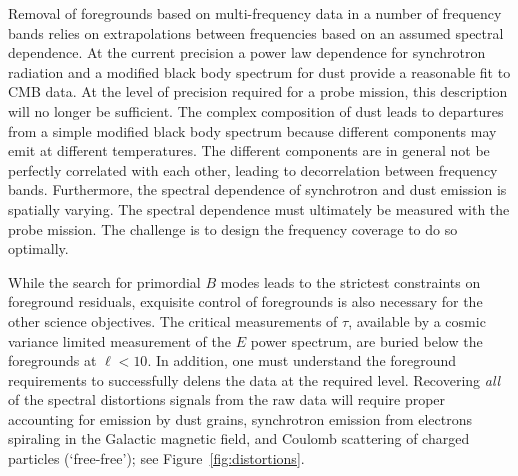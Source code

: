 
Removal of foregrounds based on multi-frequency data in a number of frequency bands relies on extrapolations between frequencies based on an assumed spectral dependence. At the current precision a power law dependence for synchrotron radiation and a modified black body spectrum for dust provide a reasonable fit to CMB data. At the level of precision required for a probe mission, this description will no longer be sufficient. The complex composition of dust leads to departures from a simple modified black body spectrum because different components may emit at different temperatures. The different components are in general not be perfectly correlated with each other, leading to decorrelation between frequency bands. Furthermore, the spectral dependence of synchrotron and dust emission is spatially varying. The spectral dependence must ultimately be measured with the probe mission. The challenge is to design the frequency coverage to do so optimally.  

While the search for primordial $B$ modes leads to the strictest constraints on foreground residuals, exquisite control of foregrounds is also necessary for the other science objectives. The critical measurements of $\tau$, available by a cosmic variance limited measurement of the $E$ power spectrum, are buried below the foregrounds at $\ell < 10$. In addition, one must understand the foreground requirements to successfully delens the data at the required level.
Recovering {\it all} of the spectral distortions signals from the raw data will require proper accounting 
for emission by dust grains, synchrotron emission from electrons spiraling in the Galactic magnetic 
field, and Coulomb scattering of charged particles (`free-free'); see Figure~\ref{fig:distortions}.   




